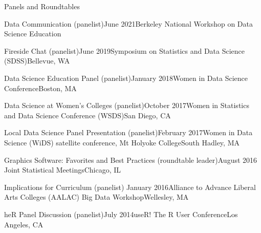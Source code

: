 \documentclass{resume} %
\begin{document}
\begin{rSection}{Panels and Roundtables}

\begin{sSubsection}{Data Communication }{ (panelist)}{June 2021}{Berkeley National Workshop on Data Science Education}{}
\end{sSubsection}

\begin{sSubsection}{Fireside Chat}{ (panelist)}{June 2019}{Symposium on Statistics and Data Science (SDSS)}{Bellevue, WA}
\end{sSubsection}

\begin{sSubsection}{Data Science Education Panel}{ (panelist)}{January 2018}{Women in Data Science Conference}{Boston, MA}
\end{sSubsection}

\begin{sSubsection}{Data Science at Women's Colleges}{ (panelist)}{October 2017}{Women in Statistics and Data Science Conference (WSDS)}{San Diego, CA}
\end{sSubsection}

\begin{sSubsection}{Local Data Science Panel Presentation}{ (panelist)}{February 2017}{Women in Data Science (WiDS) satellite conference, Mt Holyoke College}{South Hadley, MA}
\end{sSubsection}

\begin{sSubsection}{Graphics Software: Favorites and Best Practices}{ (roundtable leader)}{August 2016 }{Joint Statistical Meetings}{Chicago, IL}
\end{sSubsection}

\begin{sSubsection}{Implications for Curriculum}{ (panelist) }{January 2016}{Alliance to Advance Liberal Arts Colleges (AALAC) Big Data Workshop}{Wellesley, MA}
\end{sSubsection}

\begin{sSubsection}{heR Panel Discussion}{ (panelist)}{July 2014}{useR! The R User Conference}{Los Angeles, CA}
\end{sSubsection}


\end{rSection}
\end{document}
